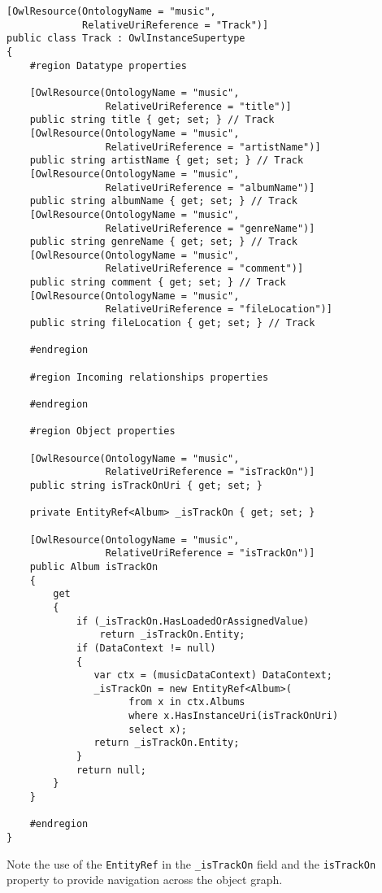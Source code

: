 \documentclass{article}
\begin{document}
\begin{verbatim}
[OwlResource(OntologyName = "music", 
             RelativeUriReference = "Track")]
public class Track : OwlInstanceSupertype
{
    #region Datatype properties

    [OwlResource(OntologyName = "music",
                 RelativeUriReference = "title")]
    public string title { get; set; } // Track
    [OwlResource(OntologyName = "music", 
                 RelativeUriReference = "artistName")]
    public string artistName { get; set; } // Track
    [OwlResource(OntologyName = "music", 
                 RelativeUriReference = "albumName")]
    public string albumName { get; set; } // Track
    [OwlResource(OntologyName = "music", 
                 RelativeUriReference = "genreName")]
    public string genreName { get; set; } // Track
    [OwlResource(OntologyName = "music", 
                 RelativeUriReference = "comment")]
    public string comment { get; set; } // Track
    [OwlResource(OntologyName = "music", 
                 RelativeUriReference = "fileLocation")]
    public string fileLocation { get; set; } // Track

    #endregion

    #region Incoming relationships properties

    #endregion

    #region Object properties

    [OwlResource(OntologyName = "music", 
                 RelativeUriReference = "isTrackOn")]
    public string isTrackOnUri { get; set; }

    private EntityRef<Album> _isTrackOn { get; set; }

    [OwlResource(OntologyName = "music", 
                 RelativeUriReference = "isTrackOn")]
    public Album isTrackOn
    {
        get
        {
            if (_isTrackOn.HasLoadedOrAssignedValue)
                return _isTrackOn.Entity;
            if (DataContext != null)
            {
               var ctx = (musicDataContext) DataContext;
               _isTrackOn = new EntityRef<Album>(
                     from x in ctx.Albums 
                     where x.HasInstanceUri(isTrackOnUri) 
                     select x);
               return _isTrackOn.Entity;
            }
            return null;
        }
    }

    #endregion
}

\end{verbatim}

Note the use of the \texttt{EntityRef} in the \texttt{\_isTrackOn} field and the
\texttt{isTrackOn} property to provide navigation across the object graph.
\end{document}
